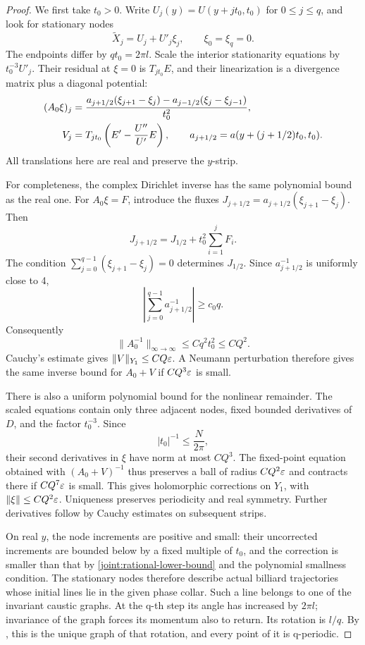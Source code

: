 \begin{proof}
We first take \(t_0>0\). Write \(U_j(y)=U(y+jt_0,t_0)\) for
\(0\le j\le q\), and look for stationary nodes
\[
 \widetilde X_j=U_j+U'_j\xi_j,
 \qquad \xi_0=\xi_q=0.
\]
The endpoints differ by \(qt_0=2\pi l\). Scale the interior stationarity
equations by \(t_0^{-3}U'_j\). Their residual at \(\xi=0\) is
\(T_{jt_0}E\), and their linearization is a divergence matrix plus a
diagonal potential:
\begin{align}
 (A_0\xi)_j
 &=\frac{a_{j+1/2}(\xi_{j+1}-\xi_j)
              -a_{j-1/2}(\xi_j-\xi_{j-1})}{t_0^2},\notag\\
 V_j&=T_{jt_0}\left(E'-\frac{U''}{U'}E\right),\qquad
 a_{j+1/2}=a(y+(j+1/2)t_0,t_0).
 \label{joint:dirichlet-linearization}
\end{align}
All translations here are real and preserve the \(y\)-strip.

For completeness, the complex Dirichlet inverse has the same polynomial
bound as the real one. For \(A_0\xi=F\), introduce the fluxes
\(J_{j+1/2}=a_{j+1/2}(\xi_{j+1}-\xi_j)\). Then
\[
 J_{j+1/2}=J_{1/2}+t_0^2\sum_{i=1}^j F_i.
\]
The condition \(\sum_{j=0}^{q-1}(\xi_{j+1}-\xi_j)=0\) determines
\(J_{1/2}\). Since \(a_{j+1/2}^{-1}\) is uniformly close to 4,
\[
 \left|\sum_{j=0}^{q-1}a_{j+1/2}^{-1}\right|\ge c_0q.
\]
Consequently
\begin{equation}
 \|A_0^{-1}\|_{\infty\to\infty}\le Cq^2t_0^2\le CQ^2.
 \label{joint:dirichlet-inverse}
\end{equation}
Cauchy's estimate gives \(\|V\|_{Y_1}\le CQ\varepsilon\). A Neumann
perturbation therefore gives the same inverse bound for \(A_0+V\) if
\(CQ^3\varepsilon\) is small.

There is also a uniform polynomial bound for the nonlinear remainder.
The scaled equations contain only three adjacent nodes, fixed bounded
derivatives of \(D\), and the factor \(t_0^{-3}\). Since
\begin{equation}
 |t_0|^{-1}\le\frac{N}{2\pi},
 \label{joint:rational-lower-bound}
\end{equation}
their second derivatives in \(\xi\) have norm at most \(CQ^3\).
The fixed-point equation obtained with \((A_0+V)^{-1}\) thus preserves a
ball of radius \(CQ^2\varepsilon\) and contracts there if \(CQ^7\varepsilon\) is
small. This gives holomorphic corrections on \(Y_1\), with
\(\|\xi\|\le CQ^2\varepsilon\). Uniqueness preserves periodicity and real
symmetry. Further derivatives follow by Cauchy estimates on subsequent
strips.

On real \(y\), the node increments are positive and small: their
uncorrected increments are bounded below by a fixed multiple of
\(t_0\), and the correction is smaller than that by
\eqref{joint:rational-lower-bound} and the polynomial smallness condition.
The stationary nodes therefore describe actual billiard trajectories
whose initial lines lie in the given phase collar. Such a line belongs
to one of the invariant caustic graphs. At the q-th step its angle has
increased by \(2\pi l\); invariance of the graph forces its momentum
also to return. Its rotation is \(l/q\). By
, this is the unique graph of that rotation,
and every point of it is q-periodic.


\end{proof}
